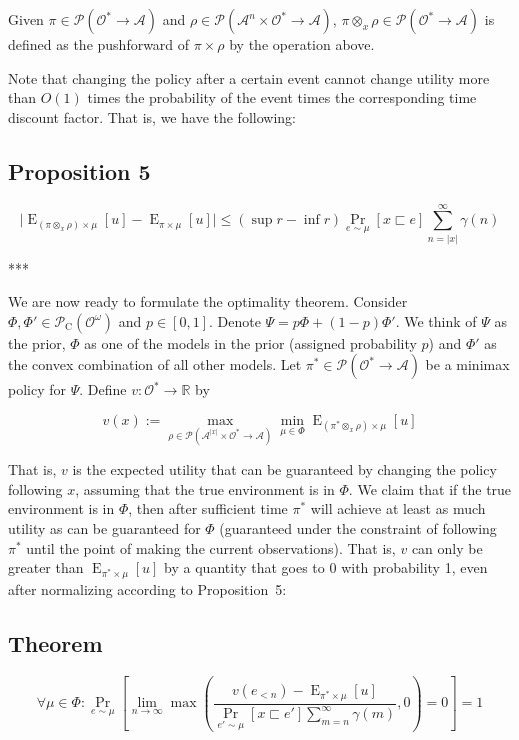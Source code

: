\documentclass[a4paper]{article}
\DeclareMathOperator{\Prb}{Pr}
\DeclareMathOperator{\E}{E}
\newcommand{\Reals}{\mathbb{R}}
\newcommand{\Abs}[1]{\lvert #1 \rvert}
\newcommand{\Prob}{\mathcal{P}}
\newcommand{\Act}{\mathcal{A}}
\newcommand{\Obs}{\mathcal{O}}
\newcommand{\ObsO}{\Obs^\omega}
\newcommand{\Pol}{\Obs^* \rightarrow \Act}
\newcommand{\CC}{\mathcal{P}_{\operatorname{C}}}
\begin{document}
Given ${\pi \in \Prob(\Pol)}$ and ${\rho \in \Prob(\Act^n \times \Pol)}$, ${\pi \otimes_x \rho \in \Prob(\Pol)}$ is defined as the pushforward of ${\pi \times \rho}$ by the operation above.

Note that changing the policy after a certain event cannot change utility more than ${O(1)}$ times the probability of the event times the corresponding time discount factor. That is, we have the following:

\subsection{Proposition 5}

$$\Abs{\E_{(\pi \otimes_x \rho) \times \mu}[u]-\E_{\pi \times \mu}[u]} \leq (\sup r - \inf r) \Prb_{e \sim \mu}[x \sqsubset e] \sum_{n = \Abs{x}}^\infty \gamma(n)$$

***

We are now ready to formulate the optimality theorem. Consider ${\Phi,\Phi' \in \CC(\ObsO)}$ and ${p \in [0,1]}$. Denote ${\Psi = p \Phi + (1-p) \Phi'}$. We think of ${\Psi}$ as the prior, ${\Phi}$ as one of the models in the prior (assigned probability ${p}$) and ${\Phi'}$ as the convex combination of all other models. Let ${\pi^* \in \Prob(\Pol)}$ be a minimax policy for ${\Psi}$. Define ${v: \Obs^* \rightarrow \Reals}$ by

$$v(x):=\max_{\rho \in \Prob(\Act^{\Abs{x}} \times \Obs^* \rightarrow \Act)} \min_{\mu \in \Phi} \E_{(\pi^* \otimes_x \rho) \times \mu}[u]$$

That is, ${v}$ is the expected utility that can be guaranteed by changing the policy following ${x}$, assuming that the true environment is in ${\Phi}$. We claim that if the true environment is in ${\Phi}$, then after sufficient time ${\pi^*}$ will achieve at least as much utility as can be guaranteed for ${\Phi}$ (guaranteed under the constraint of following ${\pi^*}$ until the point of making the current observations). That is, ${v}$ can only be greater than ${\E_{\pi^* \times \mu}[u]}$ by a quantity that goes to 0 with probability 1, even after normalizing according to Proposition~5:

\subsection{Theorem}

$$\forall \mu \in \Phi: \Prb_{e \sim \mu}[\lim_{n \rightarrow \infty} \max(\frac{v(e_{<n})-\E_{\pi^* \times \mu}[u]}{\Prb_{e' \sim \mu}[x \sqsubset e'] \sum_{m = n}^\infty \gamma(m)},0)=0] = 1$$
\end{document}
